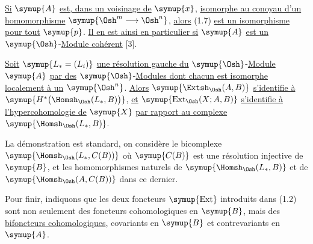  \uline{Si} $\symup{A}$ \uline{est, dans un voisinage de} $\symup{x}$, \uline{isomorphe au
conoyau d'un homomorphisme} $\symup{\Osh^{m}\longrightarrow\Osh^{n}}$, \uline{alors} (1.7) \uline{est un isomorphisme pour tout} $\symup{p}$. \uline{Il en est ainsi en
particulier si} $\symup{A}$ \uline{est un} $\symup{\Osh}$-\uline{Module cohérent} [3].

 \uline{Soit} $\symup{L_{*}=(L_i)}$ \uline{une résolution gauche du}
$\symup{\Osh}$-\uline{Module} $\symup{A}$ \uline{par des} $\symup{\Osh}$-\uline{Modules dont chacun est isomorphe localement à
un} $\symup{\Osh^{n}}$. \uline{Alors} $\symup{\Extsh_{\Osh}(A,B)}$ \uline{s'identifie à}
$\symup{H^{*}\bigl(\Homsh_{\Osh}(L_{*},B)\bigr)}$, \uline{et}
$\symup{\operatorname{Ext}_{\Osh}(X;A,B)}$ \uline{s'identifie à l'hypercohomologie de} $\symup{X}$
\uline{par rapport au complexe} $\symup{\Homsh_{\Osh}(L_{*},B)}$.

La démonstration est standard, on considère le bicomplexe
$\symup{\Homsh_{\Osh}(L_{*},C(B))}$ où $\symup{C(B)}$ est une résolution injective de $\symup{B}$, et les
homomorphismes naturels de $\symup{\Homsh_{\Osh}(L_{*},B)}$ et de
$\symup{\Homsh_{\Osh}(A,C(B))}$ dans ce dernier.

Pour finir, indiquons que les deux foncteurs $\symup{\operatorname{Ext}}$ introduits
dans (1.2) sont non seulement des foncteurs cohomologiques en $\symup{B}$, mais des
\uline{bifoncteurs cohomologiques}, covariants en $\symup{B}$ et contrevariants en $\symup{A}$.


